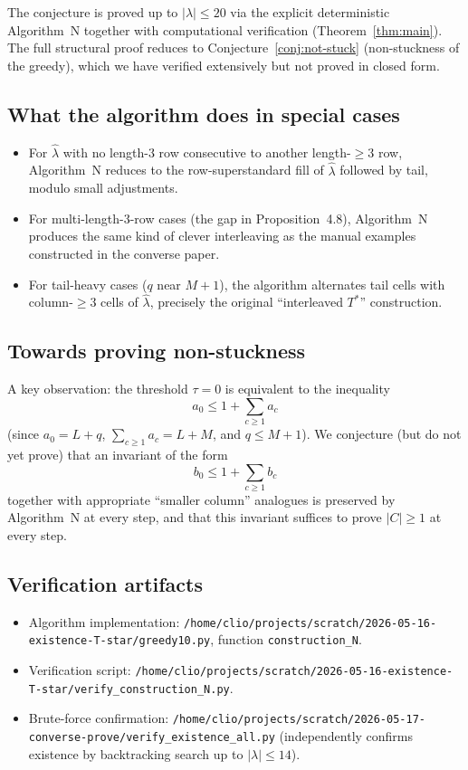 \documentclass[11pt]{article}
\theoremstyle{definition}
\newcommand{\hatl}{\widehat\lambda}
\begin{document}
The conjecture is proved up to $|\lambda| \le 20$ via the explicit
deterministic Algorithm~N together with computational verification
(Theorem~\ref{thm:main}).  The full structural proof reduces to
Conjecture~\ref{conj:not-stuck} (non-stuckness of the greedy), which
we have verified extensively but not proved in closed form.

\subsection{What the algorithm does in special cases}

\begin{itemize}
\item For $\hatl$ with no length-$3$ row consecutive to another
  length-$\ge 3$ row, Algorithm~N reduces to the row-superstandard
  fill of $\hatl$ followed by tail, modulo small adjustments.
\item For multi-length-$3$-row cases (the gap in
  Proposition~4.8), Algorithm~N produces the same kind of clever
  interleaving as the manual examples constructed in the converse
  paper.
\item For tail-heavy cases ($q$ near $M+1$), the algorithm
  alternates tail cells with column-$\ge 3$ cells of $\hatl$,
  precisely the original ``interleaved $T^*$'' construction.
\end{itemize}

\subsection{Towards proving non-stuckness}

A key observation: the threshold $\tau = 0$ is equivalent to the
inequality
\[
  a_0 \le 1 + \sum_{c \ge 1} a_c
\]
(since $a_0 = L + q$, $\sum_{c \ge 1} a_c = L + M$, and $q \le M+1$).
We conjecture (but do not yet prove) that an invariant of the form
\begin{equation}\label{eq:invariant}
  b_0 \le 1 + \sum_{c \ge 1} b_c
\end{equation}
together with appropriate ``smaller column'' analogues is preserved
by Algorithm~N at every step, and that this invariant suffices to
prove $|C| \ge 1$ at every step.

\subsection{Verification artifacts}

\begin{itemize}
\item Algorithm implementation:
  \verb|/home/clio/projects/scratch/2026-05-16-existence-T-star/greedy10.py|,
  function \verb|construction_N|.
\item Verification script:
  \verb|/home/clio/projects/scratch/2026-05-16-existence-T-star/verify_construction_N.py|.
\item Brute-force confirmation:
  \verb|/home/clio/projects/scratch/2026-05-17-converse-prove/verify_existence_all.py|
  (independently confirms existence by backtracking search up to
  $|\lambda| \le 14$).
\end{itemize}
\end{document}
